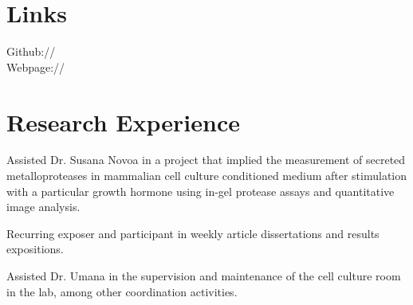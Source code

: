 \documentclass[]{deedy-resume-openfont}
\begin{document}
\begin{minipage}[t]{0.33\textwidth}
%
\section{Links}
Github:// \href{https://github.com/jspaezp}{} \\
Webpage://  \href{https://www.under_construction.com/jspaezp}{} \\
\sectionsep

\lastupdated

%
%

\end{minipage}
\hfill
\begin{minipage}[t]{0.66\textwidth}


\section{Research Experience}

\vspace{\topsep} %
\begin{tightemize}
    \item Assisted Dr. Susana Novoa in a project that implied the measurement of secreted metalloproteases in mammalian cell culture conditioned medium after stimulation with a particular growth hormone using in-gel protease assays and quantitative image analysis.
    \item Recurring exposer and participant in weekly article dissertations and results expositions.
    \item Assisted Dr. Umana in the supervision and maintenance of the cell culture room in the lab, among other coordination activities.
\end{tightemize}
\sectionsep


\end{minipage}
\end{document}
